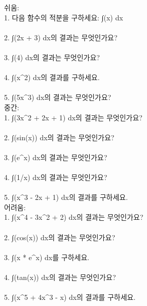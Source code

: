 \documentclass[fleqn]{article}
\begin{document}
      
        쉬움: \\  
1. 다음 함수의 적분을 구하세요: ∫(x) dx \\\\  
2. ∫(2x + 3) dx의 결과는 무엇인가요? \\\\  
3. ∫(4) dx의 결과는 무엇인가요? \\\\  
4. ∫(x^2) dx의 결과를 구하세요. \\\\  
5. ∫(5x^3) dx의 결과는 무엇인가요? \\  

중간: \\  
1. ∫(3x^2 + 2x + 1) dx의 결과는 무엇인가요? \\\\  
2. ∫(sin(x)) dx의 결과는 무엇인가요? \\\\  
3. ∫(e^x) dx의 결과는 무엇인가요? \\\\  
4. ∫(1/x) dx의 결과는 무엇인가요? \\\\  
5. ∫(x^3 - 2x + 1) dx의 결과를 구하세요. \\  

어려움: \\  
1. ∫(x^4 - 3x^2 + 2) dx의 결과는 무엇인가요? \\\\  
2. ∫(cos(x)) dx의 결과는 무엇인가요? \\\\  
3. ∫(x * e^x) dx를 구하세요. \\\\  
4. ∫(tan(x)) dx의 결과는 무엇인가요? \\\\  
5. ∫(x^5 + 4x^3 - x) dx의 결과를 구하세요. \\  

      
        
\end{document}
